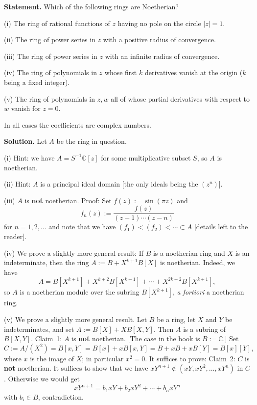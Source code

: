 \documentclass[12pt,letterpaper]{article}%
\newcommand{\nn}{\noindent}
\begin{document}
\textbf{Statement.} Which of the following rings are Noetherian?

\nn(i) The ring of rational functions of $z$ having no pole on the circle $|z|=1$.

\nn(ii) The ring of power series in $z$ with a positive radius of convergence.

\nn(iii) The ring of power series in $z$ with an infinite radius of convergence.

\nn(iv) The ring of polynomials in $z$ whose first $k$ derivatives vanish at the origin
($k$ being a fixed integer).

\nn(v) The ring of polynomials in $z,w$ all of whose partial derivatives with respect
to $w$ vanish for $z=0$.

In all cases the coefficients are complex numbers.

\nn\textbf{Solution.} Let $A$ be the ring in question.

\nn(i) Hint: we have $A=S^{-1}\mathbb C[z]$ for some multiplicative subset $S$, so $A$ is noetherian.

\nn(ii) Hint: $A$ is a principal ideal domain [the only ideals being the $(z^n)$].

\nn(iii) $A$ is \textbf{not} noetherian. Proof: Set $f(z):=\sin(\pi z)$ and 
$$
f_n(z):=\frac{f(z)}{(z-1)\cdots(z-n)}
$$ 
for $n=1,2,\ldots$ and note that we have $(f_1)<(f_2)<\cdots\subset A$ [details left to the reader].

\nn(iv) We prove a slightly more general result: If $B$ is a noetherian ring and $X$ is an indeterminate, then the ring $A:=B+X^{k+1}B[X]$ is noetherian. Indeed, we have 
$$
A=B[X^{k+1}]+X^{k+2}B[X^{k+1}]+\cdots+X^{2k+2}B[X^{k+1}],
$$ 
so $A$ is a noetherian module over the subring $B[X^{k+1}]$, \emph{a fortiori} a noetherian ring.%

\nn(v) We prove a slightly more general result. Let $B$ be a ring, let $X$ and $Y$ be indeterminates, and set $A:=B[X]+XB[X,Y]$. Then $A$ is a subring of $B[X,Y]$. Claim~1: $A$ is \textbf{not} noetherian. [The case in the book is $B:=\mathbb C$.] Set 
$$
C:=A/(X^2)=B[x,Y]=B[x]+xB[x,Y]=B+xB+xB[Y]=B[x][Y],
$$ 
where $x$ is the image of $X$; in particular $x^2=0$. It suffices to prove: Claim~2: $C$ is \textbf{not} noetherian. It suffices to show that we have $xY^{n+1}\notin(xY,xY^2,\ldots,xY^n)$ in $C$. Otherwise we would get 
$$
xY^{n+1}=b_1xY+b_2xY^2+\cdots+b_nxY^n
$$ 
with $b_i\in B$, contradiction.%
\end{document}

